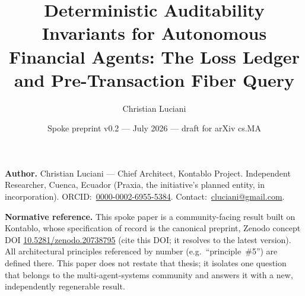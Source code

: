 \documentclass[11pt]{clapps}  %
\title{Deterministic Auditability Invariants for Autonomous
Financial Agents: The Loss Ledger and Pre-Transaction Fiber Query}
\author{Christian Luciani}
\date{\small{Spoke preprint v0.2 --- July 2026 --- draft for arXiv cs.MA}}
\begin{document}
\maketitle

\noindent\textbf{Author.} Christian Luciani --- Chief Architect, Kontablo
Project. Independent Researcher, Cuenca, Ecuador (Praxia, the initiative's
planned entity, in incorporation). ORCID:~\href{https://orcid.org/0000-0002-6955-5384}{0000-0002-6955-5384}.
Contact:~\href{mailto:cluciani@gmail.com}{cluciani@gmail.com}.

\medskip

\noindent\textbf{Normative reference.} This spoke paper is a community-facing
result built on Kontablo, whose specification of record is the canonical
preprint, Zenodo concept DOI
\href{https://doi.org/10.5281/zenodo.20738795}{10.5281/zenodo.20738795}
(cite this DOI; it resolves to the latest version). All architectural
principles referenced by number (e.g.\ ``principle~\#5'') are defined there.
This paper does not restate that thesis; it isolates one question that belongs
to the multi-agent-systems community and answers it with a new, independently
regenerable result.
\end{document}

